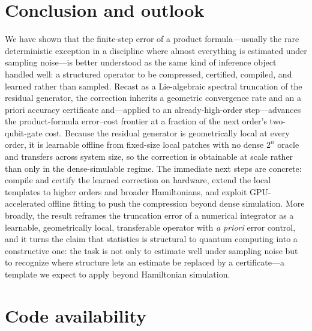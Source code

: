 \documentclass[aps,prxquantum,reprint,superscriptaddress,nofootinbib,amsmath,amssymb]{revtex4-2}
\begin{document}
\section{Conclusion and outlook}

We have shown that the finite-step error of a product formula---usually the rare deterministic exception in a discipline where almost everything is estimated under sampling noise---is better understood as the same kind of inference object handled well: a structured operator to be compressed, certified, compiled, and learned rather than sampled. Recast as a Lie-algebraic spectral truncation of the residual generator, the correction inherits a geometric convergence rate and an a priori accuracy certificate and---applied to an already-high-order step---advances the product-formula error--cost frontier at a fraction of the next order's two-qubit-gate cost. Because the residual generator is geometrically local at every order, it is learnable offline from fixed-size local patches with no dense $2^n$ oracle and transfers across system size, so the correction is obtainable at scale rather than only in the dense-simulable regime. The immediate next steps are concrete: compile and certify the learned correction on hardware, extend the local templates to higher orders and broader Hamiltonians, and exploit GPU-accelerated offline fitting to push the compression beyond dense simulation. More broadly, the result reframes the truncation error of a numerical integrator as a learnable, geometrically local, transferable operator with \emph{a priori} error control, and it turns the claim that statistics is structural to quantum computing into a constructive one: the task is not only to estimate well under sampling noise but to recognize where structure lets an estimate be replaced by a certificate---a template we expect to apply beyond Hamiltonian simulation.



\section*{Code availability}
\end{document}
